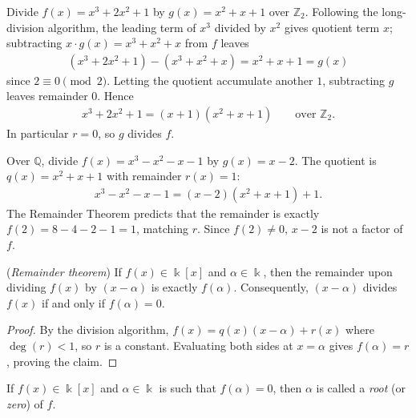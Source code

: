 \documentclass[a4paper, 12pt]{book} %
\begin{document}
\begin{example}
    Divide $f(x) = x^3 + 2x^2 + 1$ by $g(x) = x^2 + x + 1$ over $\mathbb{Z}_2$. Following the long-division algorithm, the leading term of $x^3$ divided by $x^2$ gives quotient term $x$; subtracting $x \cdot g(x) = x^3 + x^2 + x$ from $f$ leaves
    \begin{align}
        (x^3 + 2x^2 + 1) - (x^3 + x^2 + x) = x^2 + x + 1 = g(x)
    \end{align}
    since $2 \equiv 0 \pmod 2$. Letting the quotient accumulate another $1$, subtracting $g$ leaves remainder $0$. Hence
    \begin{align}
        x^3 + 2x^2 + 1 = (x + 1)(x^2 + x + 1) \qquad \text{over } \mathbb{Z}_2.
    \end{align}
    In particular $r = 0$, so $g$ divides $f$.
\end{example}

\begin{example}
    Over $\mathbb{Q}$, divide $f(x) = x^3 - x^2 - x - 1$ by $g(x) = x - 2$. The quotient is $q(x) = x^2 + x + 1$ with remainder $r(x) = 1$:
    \begin{align}
        x^3 - x^2 - x - 1 = (x - 2)(x^2 + x + 1) + 1.
    \end{align}
    The Remainder Theorem predicts that the remainder is exactly $f(2) = 8 - 4 - 2 - 1 = 1$, matching $r$. Since $f(2) \neq 0$, $x - 2$ is not a factor of $f$.
\end{example}

\begin{proposition}
    (\emph{Remainder theorem}) If $f(x) \in \Bbbk[x]$ and $\alpha \in \Bbbk$, then the remainder upon dividing $f(x)$ by $(x - \alpha)$ is exactly $f(\alpha)$. Consequently, $(x - \alpha)$ divides $f(x)$ if and only if $f(\alpha) = 0$.
\end{proposition}

\begin{proof}
    By the division algorithm, $f(x) = q(x)(x - \alpha) + r(x)$ where $\deg(r) < 1$, so $r$ is a constant. Evaluating both sides at $x = \alpha$ gives $f(\alpha) = r$, proving the claim.
\end{proof}

\begin{definition}
    If $f(x) \in \Bbbk[x]$ and $\alpha \in \Bbbk$ is such that $f(\alpha) = 0$, then $\alpha$ is called a \emph{root} (or \emph{zero}) of $f$.
\end{definition}
\end{document}
